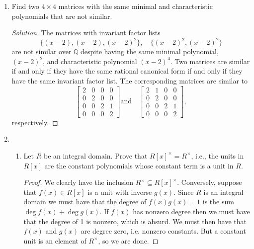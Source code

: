 \documentclass[11pt,letterpaper]{report}
\newcommand{\rationals}{\mathbb{Q}}
\newenvironment{solution}
{\begin{proof}[Solution]}
{\end{proof}}
\begin{document}
\begin{enumerate}
\begin{solution}
		\noindent The extension $\rationals(-\sqrt{3})$ definitely contains all roots of $p(x)$, some of which are irrational. Since $x^2+3$ is irreducible by Eisenstein's criterion, we have that $[\rationals(\sqrt{-3}): \rationals] = 2$, so there is no intermediate extension. We conclude that the splitting field of $p(x)$ over $\rationals$ is $\rationals(\sqrt{-3})$ and that this extension is quadratic over $\rationals$.
	\end{solution}

	\item Find two $4\times 4$ matrices with the same minimal and characteristic polynomials that are not similar.
	\begin{solution}
		The matrices with invariant factor lists
		\[
		\{(x-2), (x-2), (x-2)^2\},\quad \{(x-2)^2, (x-2)^2\}
		\]
		are not similar over $\rationals$ despite having the same minimal polynomial, $(x-2)^2$, and characteristic polynomial $(x-2)^4$. Two matrices are similar if and only if they have the same rational canonical form if and only if they have the same invariant factor list. The corresponding matrices are similar to
		\[
		\begin{bmatrix}
			2 & 0 & 0 & 0\\
			0 & 2 & 0 & 0\\
			0 & 0 & 2 & 1\\
			0 & 0 & 0 & 2
		\end{bmatrix}\text{and}\quad
		\begin{bmatrix}
			2 & 1 & 0 & 0\\
			0 & 2 & 0 & 0\\
			0 & 0 & 2 & 1\\
			0 & 0 & 0 & 2
		\end{bmatrix},
		\]
		respectively.
	\end{solution}

	\item \begin{enumerate}
		\item Let $R$ be an integral domain. Prove that $R[x]^\times = R^\times$, i.e., the units in $R[x]$ are the constant polynomials whose constant term is a unit in $R$.
		\begin{proof}
			We clearly have the inclusion $R^\times \subseteq R[x]^\times$. Conversely, suppose that $f(x)\in R[x]$ is a unit with inverse $g(x)$. Since $R$ is an integral domain we must have that the degree of $f(x)g(x)=1$ is the sum $\deg f(x) + \deg g(x)$. If $f(x)$ has nonzero degree then we must have that the degree of 1 is nonzero, which is absurd. We must then have that $f(x)$ and $g(x)$ are degree zero, i.e. nonzero constants. But a constant unit is an element of $R^\times$, so we are done.
		\end{proof}


\end{enumerate}
\end{enumerate}
\end{document}
